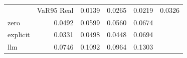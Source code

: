 \begin{tabular}{lrrrr}
\toprule
 & VaR95%
\midrule
Real & 0.0139 & 0.0265 & 0.0219 & 0.0326 \\
zero & 0.0492 & 0.0599 & 0.0560 & 0.0674 \\
explicit & 0.0331 & 0.0498 & 0.0448 & 0.0694 \\
llm & 0.0746 & 0.1092 & 0.0964 & 0.1303 \\
\bottomrule
\end{tabular}
